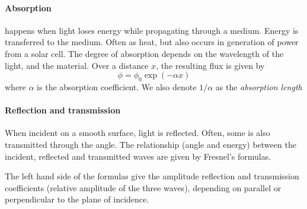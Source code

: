 \documentclass[article]{memoir}
\begin{document}
\paragraph{Absorption}
happens when light loses energy while propagating through a medium. Energy is transferred to the medium. Often as heat, but also occurs in generation of power from a solar cell. The degree of absorption depends on the wavelength of the light, and the material. Over a distance \(x\), the resulting flux is given by
\[
    \phi = \phi_0 \exp{(- \alpha x)}
\]
where \(\alpha\) is the absorption coefficient. We also denote \(1/\alpha\) as the \emph{absorption length}

\paragraph{Reflection and transmission}
When incident on a smooth surface, light is reflected. Often, some is also transmitted through the angle. The relationship (angle and energy) between the incident, reflected and transmitted waves  are given by Fresnel's formulas.

The left hand side of the formulas give the amplitude reflection and transmission coefficients (relative amplitude of the three waves), depending on parallel or perpendicular to the plane of incidence.
\end{document}
